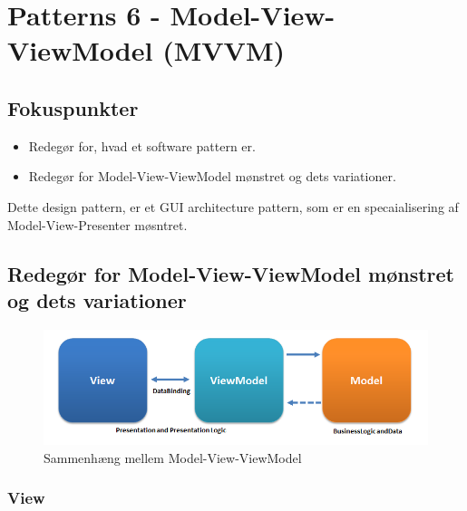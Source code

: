\section{Patterns 6 - Model-View-ViewModel (MVVM)}

\subsection{Fokuspunkter}

\begin{itemize}
	\item Redegør for, hvad et software pattern er.
	\item Redegør for Model-View-ViewModel mønstret og dets variationer.
\end{itemize}



Dette design pattern, er et GUI architecture pattern, som er en specaialisering af Model-View-Presenter møsntret.

\subsection{Redegør for Model-View-ViewModel mønstret og dets variationer}

\begin{figure}[h]
	\centering
	\includegraphics[width=\linewidth]{figs/MVVM/MVVMPattern.png}
	\caption{Sammenhæng mellem Model-View-ViewModel}
	\label{fig:MVVMPattern}
\end{figure}

\subsubsection{View}

